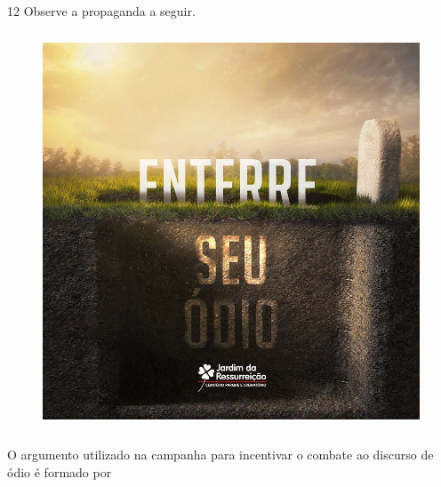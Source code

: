 

\num{12} Observe a propaganda a seguir.

\begin{figure}[H]
\centering\includegraphics[width=4.65833in,height=4.65833in]{./imgSAEB_6_POR/media/image35.jpeg}
\end{figure}

\noindent O argumento utilizado na campanha para incentivar o combate ao discurso
de ódio é formado por

